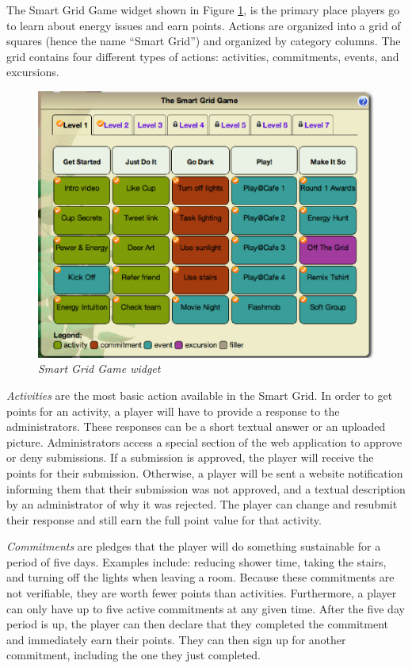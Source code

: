 The Smart Grid Game widget shown in Figure \ref{fig:SmartGrid}, is the primary place players go to learn about energy issues and earn points. Actions are organized into a grid of squares (hence the name ``Smart Grid'') and organized by category columns. The grid contains four different types of actions: activities, commitments, events, and excursions.

\begin{figure}[th]
  \center
  \includegraphics[width=0.95\columnwidth]{smart-grid.eps}
  \caption{\em \small Smart Grid Game widget}
  \label{fig:SmartGrid}
\end{figure}

{\em Activities} are the most basic action available in the Smart Grid. In order to get points for an activity, a player will have to provide a response to the administrators. These responses can be a short textual answer or an uploaded picture. Administrators access a special section of the web application to approve or deny submissions. If a submission is approved, the player will receive the points for their submission. Otherwise, a player will be sent a website notification informing them that their submission was not approved, and a textual description by an administrator of why it was rejected. The player can change and resubmit their response and still earn the full point value for that activity.

{\em Commitments} are pledges that the player will do something sustainable for a period of five days. Examples include: reducing shower time, taking the stairs, and turning off the lights when leaving a room. Because these commitments are not verifiable, they are worth fewer points than activities. Furthermore, a player can only have up to five active commitments at any given time. After the five day period is up, the player can then declare that they completed the commitment and immediately earn their points. They can then sign up for another commitment, including the one they just completed.

